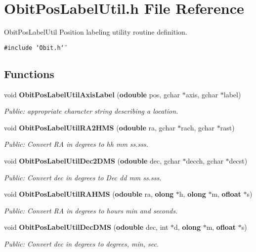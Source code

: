 \section{Obit\-Pos\-Label\-Util.h File Reference}
\label{ObitPosLabelUtil_8h}
Obit\-Pos\-Label\-Util Position labeling utility routine definition. 

{\tt \#include \char`\"{}Obit.h\char`\"{}}\par
\subsection*{Functions}
\begin{CompactItemize}
\item 
void {\bf Obit\-Pos\-Label\-Util\-Axis\-Label} ({\bf odouble} pos, gchar $\ast$axis, gchar $\ast$label)
\begin{CompactList}\small\item\em Public: appropriate character string describing a location. \item\end{CompactList}\item 
void {\bf Obit\-Pos\-Label\-Util\-RA2HMS} ({\bf odouble} ra, gchar $\ast$rach, gchar $\ast$rast)
\begin{CompactList}\small\item\em Public: Convert RA in degrees to hh mm ss.sss. \item\end{CompactList}\item 
void {\bf Obit\-Pos\-Label\-Util\-Dec2DMS} ({\bf odouble} dec, gchar $\ast$decch, gchar $\ast$decst)
\begin{CompactList}\small\item\em Public: Convert dec in degrees to Dec dd mm ss.sss. \item\end{CompactList}\item 
void {\bf Obit\-Pos\-Label\-Util\-RAHMS} ({\bf odouble} ra, {\bf olong} $\ast$h, {\bf olong} $\ast$m, {\bf ofloat} $\ast$s)
\begin{CompactList}\small\item\em Public: Convert RA in degrees to hours min and seconds. \item\end{CompactList}\item 
void {\bf Obit\-Pos\-Label\-Util\-Dec\-DMS} ({\bf odouble} dec, int $\ast$d, {\bf olong} $\ast$m, {\bf ofloat} $\ast$s)
\begin{CompactList}\small\item\em Public: Convert dec in degrees to degrees, min, sec. \item\end{CompactList}\item 

\end{CompactItemize}
